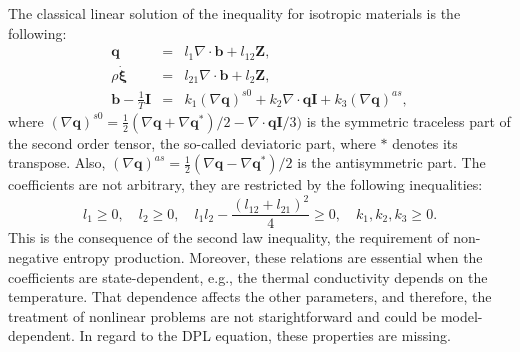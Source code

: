 \documentclass[sn-mathphys]{sn-jnl}%
\theoremstyle{thmstyleone}%
\theoremstyle{thmstyletwo}%
\theoremstyle{thmstylethree}%
\begin{document}
{The classical linear solution of the inequality for isotropic materials is the following:
\begin{eqnarray}
	{\mathbf q} &=& l_1 \nabla \cdot {\mathbf b} + l_{12} {\mathbf Z}, \label{o1}\\
	\rho\boldsymbol{\dot\xi} &=& l_{21} \nabla \cdot {\mathbf b} + l_{2} {\mathbf Z}, \label{o2}\\
	{\mathbf b} - \frac{1}{T}{\mathbf I} &=& k_1 (\nabla{\mathbf q})^{s0} + k_2 \nabla\cdot{\mathbf q}{\mathbf I} +k_3 (\nabla{\mathbf q})^{as},
	\label{o3}\end{eqnarray}
where $(\nabla{\mathbf q})^{s0} = \frac{1}{2}(\nabla{\mathbf q}+\nabla{\mathbf q}^*)/2- \nabla\cdot{\mathbf q}{\mathbf I}/3 )$ is the symmetric traceless part of the second order tensor, the so-called deviatoric part, where $*$ denotes its transpose. Also, $(\nabla{\mathbf q})^{as} = \frac{1}{2}(\nabla{\mathbf q}-\nabla{\mathbf q}^*)/2$ is the antisymmetric part. %
The coefficients are not arbitrary, they are restricted by the following inequalities:
\begin{equation}
	l_1\geq 0, \quad l_2 \geq 0, \quad l_1l_2 - \frac{(l_{12}+l_{21})^2}{4} \geq 0, \quad k_1,k_2,k_3\geq 0.
	\label{slineq}\end{equation}
This is the consequence of the second law inequality, the requirement of non-negative entropy production. Moreover, these relations are essential when the coefficients are state-dependent, e.g., the thermal conductivity depends on the temperature. That dependence affects the other parameters, and therefore, the treatment of nonlinear problems are not starightforward and could be model-dependent. In regard to the DPL equation, these properties are missing.

}
\end{document}
